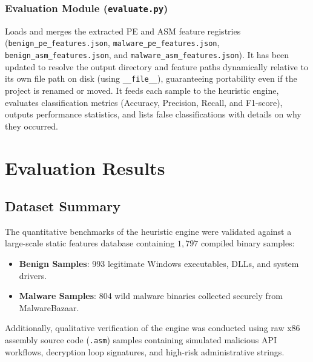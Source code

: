 \documentclass[11pt,a4paper]{article}
\begin{document}
\subsubsection{Evaluation Module (\texttt{evaluate.py})}
Loads and merges the extracted PE and ASM feature registries (\texttt{benign\_pe\_features.json}, \texttt{malware\_pe\_features.json}, \texttt{benign\_asm\_features.json}, and \texttt{malware\_asm\_features.json}). It has been updated to resolve the output directory and feature paths dynamically relative to its own file path on disk (using \texttt{\_\_file\_\_}), guaranteeing portability even if the project is renamed or moved. It feeds each sample to the heuristic engine, evaluates classification metrics (Accuracy, Precision, Recall, and F1-score), outputs performance statistics, and lists false classifications with details on why they occurred.

\newpage

\section{Evaluation Results}

\subsection{Dataset Summary}
The quantitative benchmarks of the heuristic engine were validated against a large-scale static features database containing $1,797$ compiled binary samples:
\begin{itemize}
    \item \textbf{Benign Samples}: 993 legitimate Windows executables, DLLs, and system drivers.
    \item \textbf{Malware Samples}: 804 wild malware binaries collected securely from MalwareBazaar.
\end{itemize}

Additionally, qualitative verification of the engine was conducted using raw x86 assembly source code (\texttt{.asm}) samples containing simulated malicious API workflows, decryption loop signatures, and high-risk administrative strings.
\end{document}
